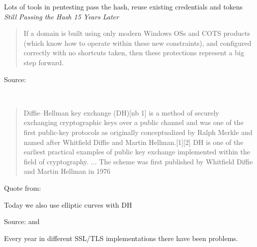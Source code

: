 \documentclass[Screen16to9,17pt]{foils}
\begin{document}
Lots of tools in pentesting pass the hash, reuse existing credentials and tokens
\emph{Still Passing the Hash 15 Years Later}\\

\begin{quote}
If a domain is built using only modern Windows OSs and COTS products (which know how to operate within these new constraints), and configured correctly with no shortcuts taken, then these protections represent a big step forward.
\end{quote}

Source:\\
{\small{}
}




{~}

\begin{quote}
Diffie–Hellman key exchange (DH)[nb 1] is a method of securely exchanging cryptographic keys over a public channel and was one of the first public-key protocols as originally conceptualized by Ralph Merkle and named after Whitfield Diffie and Martin Hellman.[1][2] DH is one of the earliest practical examples of public key exchange implemented within the field of cryptography.
... The scheme was first published by Whitfield Diffie and Martin Hellman in 1976
\end{quote}

\begin{list2}
\item Quote from: {\small {}}
\item Today we also use elliptic curves with DH \\{\small {}}
\end{list2}



Source:  and \\

Every year in different SSL/TLS implementations there have been problems.
\end{document}
